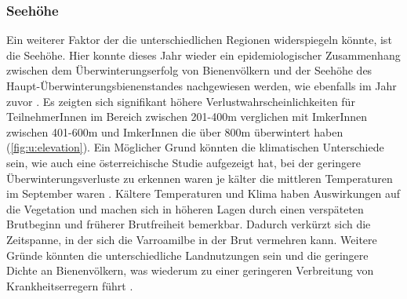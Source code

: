 \subsubsection{Seehöhe}

Ein weiterer Faktor der die unterschiedlichen Regionen widerspiegeln könnte,  ist die Seehöhe. Hier konnte dieses Jahr wieder ein epidemiologischer Zusammenhang zwischen dem Überwinterungserfolg von Bienenvölkern und der Seehöhe des Haupt-Überwinterungsbienenstandes nachgewiesen werden, wie ebenfalls im Jahr zuvor \citep{oberreiter2020}. Es zeigten sich signifikant höhere Verlustwahrscheinlichkeiten für TeilnehmerInnen im Bereich zwischen 201-400\si{\meter} verglichen mit ImkerInnen zwischen 401-600\si{\meter} und ImkerInnen die über 800\si{\meter} überwintert haben (\cref{fig:u:elevation}).
\newline
Ein Möglicher Grund könnten die klimatischen Unterschiede sein, wie auch eine österreichische Studie aufgezeigt hat, bei der geringere Überwinterungsverluste zu erkennen waren je kälter die mittleren Temperaturen im September waren \citep{switanek2017}. Kältere Temperaturen und Klima haben Auswirkungen auf die Vegetation und machen sich in höheren Lagen durch einen verspäteten Brutbeginn und früherer Brutfreiheit bemerkbar. Dadurch verkürzt sich die Zeitspanne, in der sich die Varroamilbe in der Brut vermehren kann. Weitere Gründe könnten die unterschiedliche Landnutzungen sein \citep{kuchling2018} und die geringere Dichte an Bienenvölkern, was wiederum zu einer geringeren Verbreitung von Krankheitserregern führt \citep{seeley2015, forfert2016, dynes2019}. 


